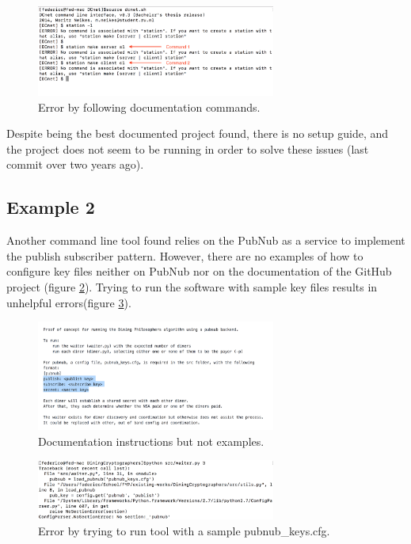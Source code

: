 \begin{figure}[h!]
    \centering
    \includegraphics[width=0.7\textwidth]{Images/work1WellDocumentedError.png}
    \caption{Error by following documentation commands.}
    \label{fig:work1error}
\end{figure}

Despite being the best documented project found, there is no setup guide, and the project does not seem to be running in order to solve these issues (last commit over two years ago).

\subsection{Example 2}
Another command line tool found relies on the PubNub as a service to implement the publish subscriber pattern. However, there are no examples of how to configure key files neither on PubNub nor on the documentation of the GitHub project (figure \ref{fig:work2documentation}). Trying to run the software with sample key files results in unhelpful errors(figure \ref{fig:work2error}). 

\begin{figure}[h!]
    \centering
    \includegraphics[width=0.7\textwidth]{Images/work2Documentation.png}
    \caption{Documentation instructions but not examples.}
    \label{fig:work2documentation}
\end{figure}

\begin{figure}[h!]
    \centering
    \includegraphics[width=0.7\textwidth]{Images/work2Error.png}
    \caption{Error by trying to run tool with a sample pubnub{\_}keys.cfg.}
    \label{fig:work2error}
\end{figure}

